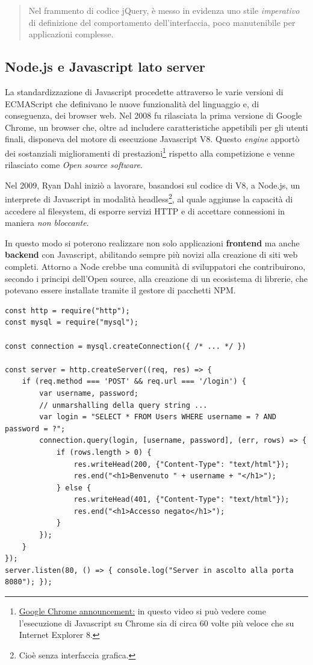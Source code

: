 \begin{quote}
Nel frammento di codice jQuery, è messo in evidenza uno stile
\emph{imperativo} di definizione del comportamento dell'interfaccia,
poco manutenibile per applicazioni complesse.
\end{quote}

\subsection{Node.js e Javascript lato
server}\label{node.js-e-javascript-lato-server}

La standardizzazione di Javascript procedette attraverso le varie
versioni di ECMAScript che definivano le nuove funzionalità del
linguaggio e, di conseguenza, dei browser web. Nel 2008 fu rilasciata la
prima versione di Google Chrome, un browser che, oltre ad includere
caratteristiche appetibili per gli utenti finali, disponeva del motore
di esecuzione Javascript V8. Questo \emph{engine} apportò dei
sostanziali miglioramenti di prestazioni\footnote{\href{https://youtu.be/LRmrMiOWdfc?si=gaHRFdA8QcYZ0NYq&t=2676}{Google
  Chrome announcement:} in questo video si può vedere come l'esecuzione
  di Javascript su Chrome sia di circa 60 volte più veloce che su
  Internet Explorer 8.} rispetto alla competizione e venne rilasciato
come \emph{Open source software}.

Nel 2009, Ryan Dahl iniziò a lavorare, basandosi sul codice di V8, a
Node.js, un interprete di Javascript in modalità headless\footnote{Cioè
  senza interfaccia grafica.}, al quale aggiunse la capacità di accedere
al filesystem, di esporre servizi HTTP e di accettare connessioni in
maniera \emph{non bloccante}.

In questo modo si poterono realizzare non solo applicazioni
\textbf{frontend} ma anche \textbf{backend} con Javascript, abilitando
sempre più novizi alla creazione di siti web completi. Attorno a Node
crebbe una comunità di sviluppatori che contribuirono, secondo i
principi dell'Open source, alla creazione di un ecosistema di librerie,
che potevano essere installate tramite il gestore di pacchetti NPM.

\begin{verbatim}
const http = require("http");
const mysql = require("mysql");

const connection = mysql.createConnection({ /* ... */ })

const server = http.createServer((req, res) => {
    if (req.method === 'POST' && req.url === '/login') {
        var username, password;
        // unmarshalling della query string ...
        var login = "SELECT * FROM Users WHERE username = ? AND password = ?";
        connection.query(login, [username, password], (err, rows) => {
            if (rows.length > 0) {
                res.writeHead(200, {"Content-Type": "text/html"});
                res.end("<h1>Benvenuto " + username + "</h1>");
            } else {
                res.writeHead(401, {"Content-Type": "text/html"});
                res.end("<h1>Accesso negato</h1>");
            }
        });
    }
});
server.listen(80, () => { console.log("Server in ascolto alla porta 8080"); });
\end{verbatim}


